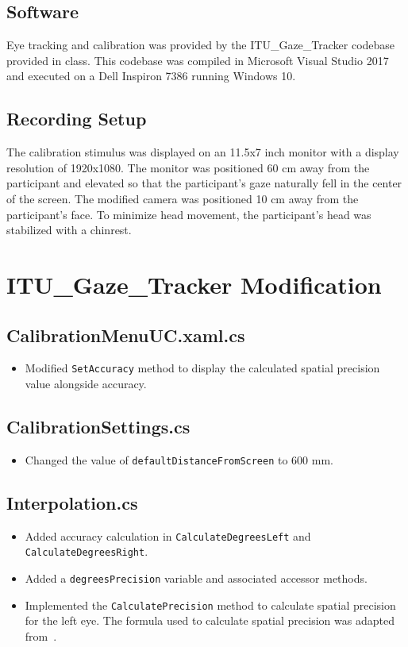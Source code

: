\documentclass[11pt]{article}
\begin{document}
\subsection{Software}
\label{subsec:software}
Eye tracking and calibration was provided by the ITU\_Gaze\_Tracker codebase
provided in class.
This codebase was compiled in Microsoft Visual Studio 2017 and executed on a
Dell Inspiron 7386 running Windows 10.

\subsection{Recording Setup}
\label{subsec:recording_setup}
The calibration stimulus was displayed on an 11.5x7 inch monitor with a display
resolution of 1920x1080.
The monitor was positioned 60 cm away from the participant and elevated so that
the participant's gaze naturally fell in the center of the screen.
The modified camera was positioned 10 cm away from the participant's face.
To minimize head movement, the participant's head was stabilized with a chinrest.

\section{ITU\_Gaze\_Tracker Modification}
\label{sec:itu_gaze_tracker_modification} %

\subsection*{CalibrationMenuUC.xaml.cs}
    \begin{itemize}
        \item Modified \texttt{SetAccuracy} method to display the calculated
        spatial precision value alongside accuracy.
    \end{itemize}
\subsection*{CalibrationSettings.cs}
    \begin{itemize}
        \item Changed the value of \texttt{defaultDistanceFromScreen} to 600 mm.
    \end{itemize}

\subsection*{Interpolation.cs}
 \begin{itemize}
    \item Added accuracy calculation in \texttt{CalculateDegreesLeft} and
    \texttt{CalculateDegreesRight}.
    \item Added a \texttt{degreesPrecision} variable and associated accessor
    methods.
    \item Implemented the \texttt{CalculatePrecision} method to calculate
    spatial precision for the left eye.
    The formula used to calculate spatial precision was adapted from~\cite{Holmqvist}.
 \end{itemize}
\end{document}
